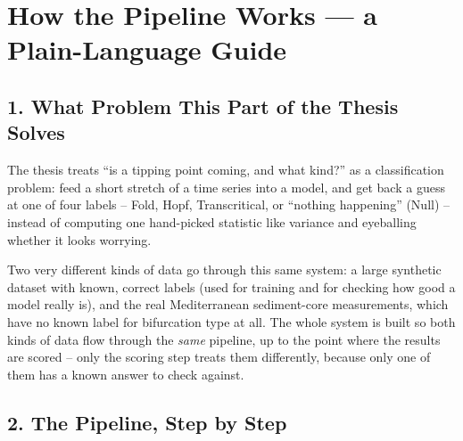 %

\section*{How the Pipeline Works --- a Plain-Language Guide}

\subsection*{1. What Problem This Part of the Thesis Solves}

The thesis treats ``is a tipping point coming, and what kind?'' as a
classification problem: feed a short stretch of a time series into a
model, and get back a guess at one of four labels -- Fold, Hopf,
Transcritical, or ``nothing happening'' (Null) -- instead of computing one
hand-picked statistic like variance and eyeballing whether it looks
worrying.

Two very different kinds of data go through this same system: a large
synthetic dataset with known, correct labels (used for training and for
checking how good a model really is), and the real Mediterranean
sediment-core measurements, which have no known label for bifurcation
type at all. The whole system is built so both kinds of data flow through
the \emph{same} pipeline, up to the point where the results are scored --
only the scoring step treats them differently, because only one of them
has a known answer to check against.

\subsection*{2. The Pipeline, Step by Step}

